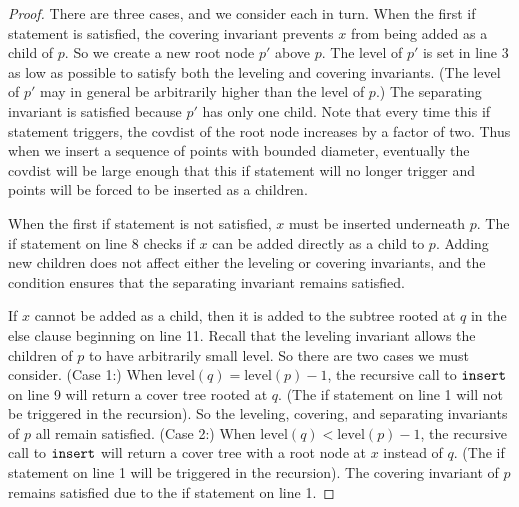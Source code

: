 \documentclass[../main.tex]{subfiles}
\newcommand{\mkfunction}[1]{\ensuremath{\text{{#1}}}}
\newcommand{\level}[1]      {\mkfunction{level}({#1})}
\newcommand{\ctinsert}{\ensuremath{\textnormal{\ttfamily insert}}}
\begin{document}
\begin{proof}
    There are three cases, and we consider each in turn.
    When the first if statement is satisfied, 
    the covering invariant prevents $x$ from being added as a child of $p$.
    So we create a new root node $p'$ above $p$.
    The level of $p'$ is set in line 3 as low as possible to satisfy both the leveling and covering invariants.
    (The level of $p'$ may in general be arbitrarily higher than the level of $p$.)
    The separating invariant is satisfied because $p'$ has only one child.
    Note that every time this if statement triggers,
    the $\mkfunction{covdist}$ of the root node increases by a factor of two.
    Thus when we insert a sequence of points with bounded diameter, 
    eventually the $\mkfunction{covdist}$ will be large enough that this if statement will no longer trigger and points will be forced to be inserted as a children.

    When the first if statement is not satisfied, 
    $x$ must be inserted underneath $p$.
    The if statement on line 8 checks if $x$ can be added directly as a child to $p$.
    Adding new children does not affect either the leveling or covering invariants,
    and the condition ensures that the separating invariant remains satisfied.

    If $x$ cannot be added as a child, 
    then it is added to the subtree rooted at $q$ in the else clause beginning on line 11.
    Recall that the leveling invariant allows the children of $p$ to have arbitrarily small level.
    So there are two cases we must consider.
    (Case 1:) When $\level{q}=\level{p}-1$, 
    the recursive call to $\ctinsert$ on line 9 will return a cover tree rooted at $q$.
    (The if statement on line 1 will not be triggered in the recursion).
    So the leveling, covering, and separating invariants of $p$ all remain satisfied.
    (Case 2:) When $\level{q}<\level{p}-1$, 
    the recursive call to $\ctinsert$ will return a cover tree with a root node at $x$ instead of $q$.
    (The if statement on line 1 will be triggered in the recursion).
    The covering invariant of $p$ remains satisfied due to the if statement on line 1.
\end{proof}
\end{document}
